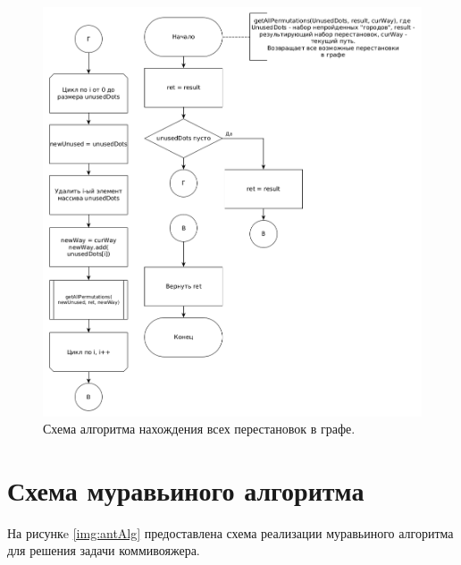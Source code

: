 \documentclass[12pt]{report}
\begin{document}
\begin{figure}
\begin{center}
\includegraphics[scale=0.4]{inc/img/bruteForce2.png}
\captionsetup{justification=centering}
	\caption{Схема алгоритма нахождения всех перестановок в графе.}
	\label{img:bruteForce2}	
\end{center}
\end{figure}


\section{Схема муравьиного алгоритма}
На рисункe \ref{img:antAlg} предоставлена схема реализации муравьиного алгоритма для решения задачи коммивояжера.
\end{document}
